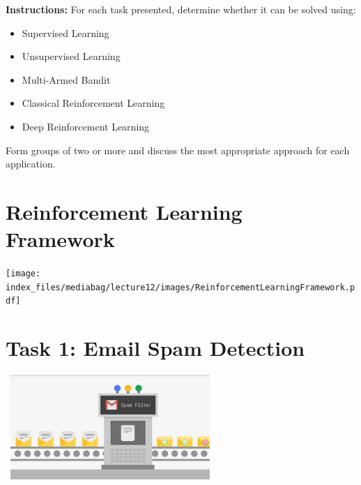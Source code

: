 \documentclass[
  letterpaper,
  DIV=11,
  numbers=noendperiod]{scrreprt}
\providecommand{\tightlist}{%
  \setlength{\itemsep}{0pt}\setlength{\parskip}{0pt}}\usepackage{longtable,booktabs,array}
\begin{document}
\begin{tcolorbox}[enhanced jigsaw, opacityback=0, left=2mm, breakable, bottomtitle=1mm, rightrule=.15mm, colframe=quarto-callout-note-color-frame, titlerule=0mm, colback=white, opacitybacktitle=0.6, toptitle=1mm, title=\textcolor{quarto-callout-note-color}{\faInfo}\hspace{0.5em}{Note}, colbacktitle=quarto-callout-note-color!10!white, bottomrule=.15mm, arc=.35mm, coltitle=black, leftrule=.75mm, toprule=.15mm]

\textbf{Instructions:} For each task presented, determine whether it can
be solved using:

\begin{itemize}
\tightlist
\item
  Supervised Learning\\
\item
  Unsupervised Learning\\
\item
  Multi-Armed Bandit\\
\item
  Classical Reinforcement Learning\\
\item
  Deep Reinforcement Learning
\end{itemize}

Form groups of two or more and discuss the most appropriate approach for
each application.

\end{tcolorbox}

\section{Reinforcement Learning
Framework}\label{reinforcement-learning-framework}

\texttt{[image: index\_files/mediabag/lecture12/images/ReinforcementLearningFramework.pdf]}

\section{Task 1: Email Spam
Detection}\label{task-1-email-spam-detection}

\includegraphics[width=3.125in,height=1.5625in]{lecture12/images/SupervisedLearning.png}
\end{document}
